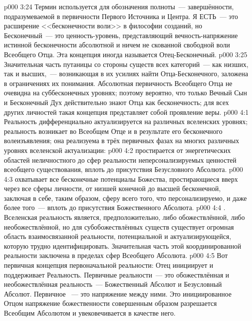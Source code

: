 \vs p000 3:24 \pc Термин  используется для обозначения полноты~--- завершённости, подразумеваемой в первичности Первого Источника и Центра.  Я ЕСТЬ~--- это расширение <<бесконечности воли>> в философии созданий, но Бесконечный~--- это  ценность\hyp{}уровень, представляющий вечность\hyp{}напряжение истинной бесконечности абсолютной и ничем не скованной свободной воли Всеобщего Отца. Эта концепция иногда называется Отец\hyp{}Бесконечный.
\vs p000 3:25 Значительная часть путаницы со стороны существ всех категорий~--- как низших, так и высших,~--- возникающая в их усилиях найти Отца\hyp{}Бесконечного, заложена в ограничениях их понимания. Абсолютная первичность Всеобщего Отца не очевидна на суббесконечных уровнях; поэтому вероятно, что только Вечный Сын и Бесконечный Дух действительно знают Отца как бесконечность; для всех других личностей такая концепция представляет собой проявление веры.
\vs p000 4:1 Реальность дифференциально актуализируется на различных вселенских уровнях; реальность возникает во Всеобщем Отце и в результате его бесконечного волеизъявления; она реализуема в трёх первичных фазах на многих различных уровнях вселенской актуализации:
\vs p000 4:2  простирается от энергетических областей неличностного до сфер реальности неперсонализируемых ценностей всеобщего существования, вплоть до присутствия Безусловного Абсолюта.
\vs p000 4:3  охватывает все бесконечные потенциалы Божества, простирающиеся вверх через все сферы личности, от низшей конечной до высшей бесконечной, заключая в себе, таким образом, сферу всего того, что персонализируемо, и даже более того~--- вплоть до присутствия Божественного Абсолюта.
\vs p000 4:4 . Вселенская реальность является, предположительно, либо обожествлённой, либо необожествлённой, но для субобожествлённых существ существует огромная область взаимосвязанной реальности, потенциальной и актуализирующейся, которую трудно идентифицировать. Значительная часть этой координированной реальности заключена в пределах сфер Всеобщего Абсолюта.
\vs p000 4:5 Вот первичная концепция первоначальной реальности: Отец инициирует и поддерживает Реальность. Первичные  реальности~--- это обожествлённая и необожествлённая реальность~--- Божественный Абсолют и Безусловный Абсолют. Первичное ~--- это напряжение между ними. Это инициированное Отцом напряжение божественности совершенным образом разрешается Всеобщим Абсолютом и увековечивается в качестве него.
